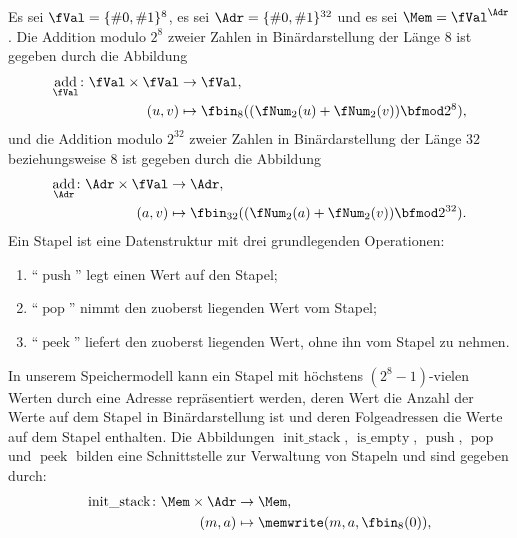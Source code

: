 \documentclass[12pt]{article}
\DeclareMathOperator{\add}{add}
\DeclareMathOperator{\stack}{init\_stack}
\DeclareMathOperator{\emptyX}{is\_empty}
\DeclareMathOperator{\push}{push}
\DeclareMathOperator{\pop}{pop}
\DeclareMathOperator{\peek}{peek}
\begin{document}


\begin{aufgabe}[1 + 1 + 4 = 6]
  Es sei $\fVal = \{\#0, \#1\}^8$, es sei $\Adr = \{\#0, \#1\}^{32}$ und es sei $\Mem = \fVal^\Adr$. Die Addition modulo $2^8$ zweier Zahlen in Binärdarstellung der Länge $8$ ist gegeben durch die Abbildung
  \begin{align*}
    \add_{\fVal} \colon \fVal \times \fVal &\to     \fVal,\\
                                    (u, v) &\mapsto \fbin_8((\fNum_2(u) + \fNum_2(v)) \bfmod 2^8),
  \end{align*}
  und die Addition modulo $2^{32}$ zweier Zahlen in Binärdarstellung der Länge $32$ beziehungsweise $8$ ist gegeben durch die Abbildung
  \begin{align*}
    \add_{\Adr} \colon \Adr \times \fVal &\to     \Adr,\\
                                  (a, v) &\mapsto \fbin_{32}((\fNum_2(a) + \fNum_2(v)) \bfmod 2^{32}).
  \end{align*}
  Ein Stapel ist eine Datenstruktur mit drei grundlegenden Operationen:
  \begin{enumerate}
    \item \enquote{$\push$} legt einen Wert auf den Stapel;
    \item \enquote{$\pop$} nimmt den zuoberst liegenden Wert vom Stapel;
    \item \enquote{$\peek$} liefert den zuoberst liegenden Wert, ohne ihn vom Stapel zu nehmen.
  \end{enumerate}
  In unserem Speichermodell kann ein Stapel mit höchstens $(2^8 - 1)$-vielen Werten durch eine Adresse repräsentiert werden, deren Wert die Anzahl der Werte auf dem Stapel in Binärdarstellung ist und deren Folgeadressen die Werte auf dem Stapel enthalten. Die Abbildungen $\stack$, $\emptyX$, $\push$, $\pop$ und $\peek$ bilden eine Schnittstelle zur Verwaltung von Stapeln und sind gegeben durch:
  \begin{align*}
    \stack \colon \Mem \times \Adr &\to     \Mem,\\
                            (m, a) &\mapsto \memwrite(m, a, \fbin_8(0)),
  \end{align*}
  \begin{align*}

\end{align*}
\end{aufgabe}
\end{document}
